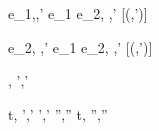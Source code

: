   {e_1,\sigma \normalise {},\hat{\sigma}'}
  {e_1 \Xor e_2,\sigma \xrightarrow[]{\Left} ,\hat{\sigma}'}
  [\neg\Failing(,\hat{\sigma}')]

  {e_2,\sigma \hat{\normalise} ,\hat{\sigma}'}
  {e_1 \Xor e_2,\sigma \xrightarrow[]{\Right} ,\hat{\sigma}'}
  [\neg\Failing(,\hat{\sigma}')]




  {,\hat{\sigma}  ',\hat{\sigma}'}



  {t,\sigma {} ',\hat{\sigma}' \Quad
   ',\hat{\sigma}' \hat{\normalise} '',\hat{\sigma}''}
  {t,\sigma {} '',\hat{\sigma}''}
